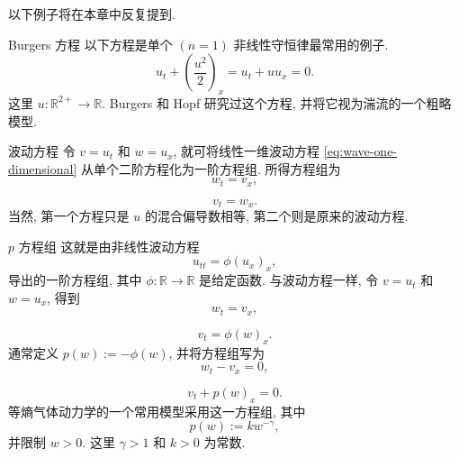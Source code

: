 以下例子将在本章中反复提到.

\begin{Example}{Burgers 方程}
\label{ex:burgers-equation}
以下方程是单个 $(n=1)$ 非线性守恒律最常用的例子.
\begin{equation}\label{eq:burgers-conservation-law}
u_t+\left(\dfrac{u^2}{2}\right)_x=u_t+uu_x=0.
\end{equation}
这里 $u:\mathbb{R}^{2+}\to\mathbb{R}$. Burgers 和 Hopf 研究过这个方程, 并将它视为湍流的一个粗略模型.
\end{Example}

\begin{Example}{波动方程}
\label{ex:wave-first-order-system}
令 $v=u_t$ 和 $w=u_x$, 就可将线性一维波动方程 \eqref{eq:wave-one-dimensional} 从单个二阶方程化为一阶方程组. 所得方程组为
\begin{equation}\label{eq:wave-first-order-w}
w_t=v_x,
\end{equation}

\begin{equation}\label{eq:wave-first-order-v}
v_t=w_x.
\end{equation}
当然, 第一个方程只是 $u$ 的混合偏导数相等, 第二个则是原来的波动方程.
\end{Example}

\begin{Example}{$p$ 方程组}
\label{ex:p-system}
这就是由非线性波动方程
\[
u_{tt}=\phi(u_x)_x,
\]
导出的一阶方程组, 其中 $\phi:\mathbb{R}\to\mathbb{R}$ 是给定函数. 与波动方程一样, 令 $v=u_t$ 和 $w=u_x$, 得到
\begin{equation}\label{eq:nonlinear-wave-first-order-w}
w_t=v_x,
\end{equation}

\begin{equation}\label{eq:nonlinear-wave-first-order-v}
v_t=\phi(w)_x.
\end{equation}
通常定义 $p(w):=-\phi(w)$, 并将方程组写为
\begin{equation}\label{eq:p-system-volume}
w_t-v_x=0,
\end{equation}

\begin{equation}\label{eq:p-system-velocity}
v_t+p(w)_x=0.
\end{equation}
等熵气体动力学的一个常用模型采用这一方程组, 其中
\begin{equation}\label{eq:isentropic-pressure-law}
p(w):=kw^{-\gamma},
\end{equation}
并限制 $w>0$. 这里 $\gamma>1$ 和 $k>0$ 为常数.
\end{Example}

